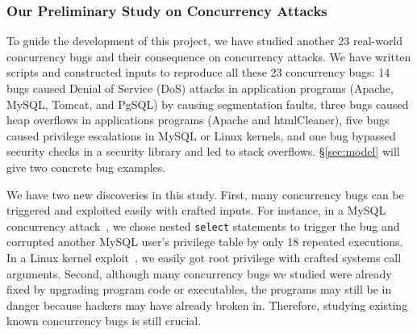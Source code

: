 


\vspace{-.15in}\subsubsection{Our Preliminary Study on Concurrency Attacks} 
\label{sec:out-study}\vspace{-.075in}

To guide the development of this \xxx project, we have studied another 23 
real-world concurrency bugs and their consequence on concurrency attacks. We 
have written scripts and constructed inputs to reproduce all these 23 
concurrency bugs: 14 bugs caused Denial of Service (DoS) attacks in application 
programs (Apache, MySQL, Tomcat, and PgSQL) by causing segmentation faults, 
three bugs caused heap overflows in applications programs (Apache and 
htmlCleaner), five bugs caused privilege escalations in MySQL or Linux kernels, 
and one bug bypassed security checks in a security library \libsafe and led to 
stack overflows. \S\ref{sec:model} will give two concrete bug examples.

We have two new discoveries in this study. First, many concurrency bugs can be 
triggered and exploited easily with crafted inputs. For instance, in a MySQL 
concurrency attack~\cite{mysql-bug-14747}, we chose nested 
\texttt{select} statements to trigger the bug and corrupted another 
MySQL user's privilege table by only 18 repeated executions. In a Linux kernel 
exploit~\cite{uselib-bug-12791}, we easily got root privilege with 
crafted systems call arguments. Second, although many concurrency bugs we 
studied were already fixed by upgrading program code or executables, the 
programs may still be in danger because hackers may have already broken in. 
Therefore, studying existing known concurrency bugs is still crucial.

